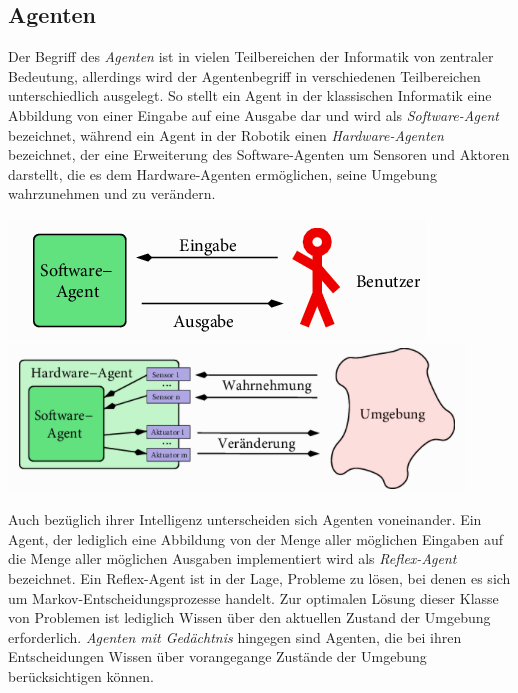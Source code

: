 \documentclass[fontsize=11pt]{scrartcl}
\newenvironment{Figure}
  {\par\medskip\noindent\minipage{\linewidth}}
  {\endminipage\par\medskip}
\newcommand*{\quelle}{%
  \footnotesize Quelle: 
}
\begin{document}
            \subsection{Agenten}
                Der Begriff des \emph{Agenten} ist in vielen Teilbereichen der Informatik von zentraler Bedeutung, allerdings wird der Agentenbegriff in verschiedenen Teilbereichen unterschiedlich ausgelegt. So stellt ein Agent in der klassischen Informatik eine Abbildung von einer Eingabe auf eine Ausgabe dar und wird als \emph{Software-Agent} bezeichnet, während ein Agent in der Robotik einen \emph{Hardware-Agenten} bezeichnet, der eine Erweiterung des Software-Agenten um Sensoren und Aktoren darstellt, die es dem Hardware-Agenten ermöglichen, seine Umgebung wahrzunehmen und zu verändern. \cite{ertel2016}
                \begin{Figure}
                    \centering
                    \includegraphics[scale=0.6]{softwareagent.png}
                    \includegraphics[scale=0.6]{hardwareagent.png}
                    \raggedleft \footnotesize\cite[S.18, Abb. 1.5, S19, Abb. 1.6]{ertel2016}
                \end{Figure}
                Auch bezüglich ihrer Intelligenz unterscheiden sich Agenten voneinander.
                Ein Agent, der lediglich eine Abbildung von der Menge aller möglichen Eingaben auf die Menge aller möglichen Ausgaben implementiert wird als \emph{Reflex-Agent} bezeichnet. Ein Reflex-Agent ist in der Lage, Probleme zu lösen, bei denen es sich um Markov-Entscheidungsprozesse handelt. Zur optimalen Lösung dieser Klasse von Problemen ist lediglich Wissen über den aktuellen Zustand der Umgebung erforderlich.\cite{ertel2016}
                \newline
                \emph{Agenten mit Gedächtnis} hingegen sind Agenten, die bei ihren Entscheidungen Wissen über vorangegange Zustände der Umgebung berücksichtigen können.\cite{ertel2016}
            
\end{document}
